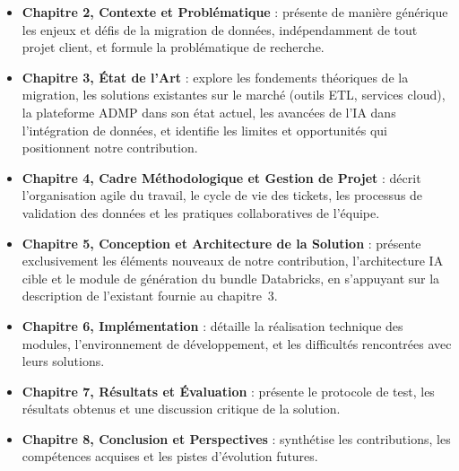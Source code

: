 \begin{itemize}[leftmargin=*]
    \item \textbf{Chapitre 2, Contexte et Problématique} : présente de manière générique les enjeux et défis de la migration de données, indépendamment de tout projet client, et formule la problématique de recherche.
    
    \item \textbf{Chapitre 3, État de l'Art} : explore les fondements théoriques de la migration, les solutions existantes sur le marché (outils ETL, services cloud), la plateforme ADMP dans son état actuel, les avancées de l'IA dans l'intégration de données, et identifie les limites et opportunités qui positionnent notre contribution.
    
    \item \textbf{Chapitre 4, Cadre Méthodologique et Gestion de Projet} : décrit l'organisation agile du travail, le cycle de vie des tickets, les processus de validation des données et les pratiques collaboratives de l'équipe.
    
    \item \textbf{Chapitre 5, Conception et Architecture de la Solution} : présente exclusivement les éléments nouveaux de notre contribution, l'architecture IA cible et le module de génération du bundle Databricks, en s'appuyant sur la description de l'existant fournie au chapitre~3.
    
    \item \textbf{Chapitre 6, Implémentation} : détaille la réalisation technique des modules, l'environnement de développement, et les difficultés rencontrées avec leurs solutions.
    
    \item \textbf{Chapitre 7, Résultats et Évaluation} : présente le protocole de test, les résultats obtenus et une discussion critique de la solution.
    
    \item \textbf{Chapitre 8, Conclusion et Perspectives} : synthétise les contributions, les compétences acquises et les pistes d'évolution futures.
\end{itemize}
